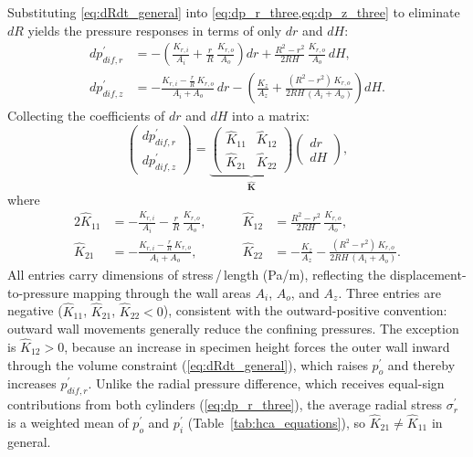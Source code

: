 \documentclass[a4paper,fleqn]{cas-sc}
\begin{document}
Substituting \cref{eq:dRdt_general} into \cref{eq:dp_r_three,eq:dp_z_three} to eliminate $dR$ yields the pressure responses in terms of only $dr$ and $dH$:
\begin{align}
dp_{dif,r}^{\prime}
  &= -\!\left(\frac{K_{r,i}}{A_i}+\frac{r}{R}\,\frac{K_{r,o}}{A_o}\right)dr
     +\frac{R^2-r^2}{2RH}\,\frac{K_{r,o}}{A_o}\,dH, \label{eq:dp_r_two}\\[6pt]
dp_{dif,z}^{\prime}
  &= -\frac{K_{r,i}-\frac{r}{R}\,K_{r,o}}{A_i+A_o}\,dr
     -\!\left(\frac{K_z}{A_z}+\frac{(R^2-r^2)\,K_{r,o}}{2RH\,(A_i+A_o)}\right)dH. \label{eq:dp_z_two}
\end{align}
Collecting the coefficients of $dr$ and $dH$ into a matrix:
\begin{equation}
\begin{pmatrix} dp_{dif,r}^{\prime} \\[4pt] dp_{dif,z}^{\prime} \end{pmatrix}
=
\underbrace{\begin{pmatrix} \hat{K}_{11} & \hat{K}_{12} \\[8pt] \hat{K}_{21} & \hat{K}_{22} \end{pmatrix}}_{\hat{\mathbf{K}}}
\begin{pmatrix} dr \\[4pt] dH \end{pmatrix},
\label{eq:stiffness_matrix}
\end{equation}
where
\begin{alignat}{2}
\hat{K}_{11} &= -\frac{K_{r,i}}{A_i}-\frac{r}{R}\,\frac{K_{r,o}}{A_o}, &\qquad
\hat{K}_{12} &= \frac{R^2-r^2}{2RH}\,\frac{K_{r,o}}{A_o}, \label{eq:Khat_row1}\\[4pt]
\hat{K}_{21} &= -\frac{K_{r,i}-\frac{r}{R}\,K_{r,o}}{A_i+A_o}, &\qquad
\hat{K}_{22} &= -\frac{K_z}{A_z}-\frac{(R^2-r^2)\,K_{r,o}}{2RH\,(A_i+A_o)}. \label{eq:Khat_row2}
\end{alignat}
All entries carry dimensions of stress\,/\,length (Pa/m), reflecting the displacement-to-pressure mapping through the wall areas $A_i$, $A_o$, and $A_z$. Three entries are negative ($\hat{K}_{11}$, $\hat{K}_{21}$, $\hat{K}_{22}<0$), consistent with the outward-positive convention: outward wall movements generally reduce the confining pressures. The exception is $\hat{K}_{12}>0$, because an increase in specimen height forces the outer wall inward through the volume constraint (\cref{eq:dRdt_general}), which raises $p_o^{\prime}$ and thereby increases $p_{dif,r}^{\prime}$. Unlike the radial pressure difference, which receives equal-sign contributions from both cylinders (\cref{eq:dp_r_three}), the average radial stress $\sigma_r^{\prime}$ is a weighted mean of $p_o^{\prime}$ and $p_i^{\prime}$ (Table~\ref{tab:hca_equations}), so $\hat{K}_{21}\neq\hat{K}_{11}$ in general.
\end{document}
